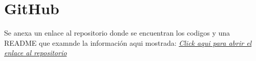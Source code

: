 \appendix
\chapter{GitHub}
Se anexa un enlace al repositorio donde se encuentran los codigos y una README que examnde la información aqui mostrada: \href{https://github.com/CARBAJE/Practica02-TSAB}{\textit{Click aqui para abrir el enlace al repositorio}}

